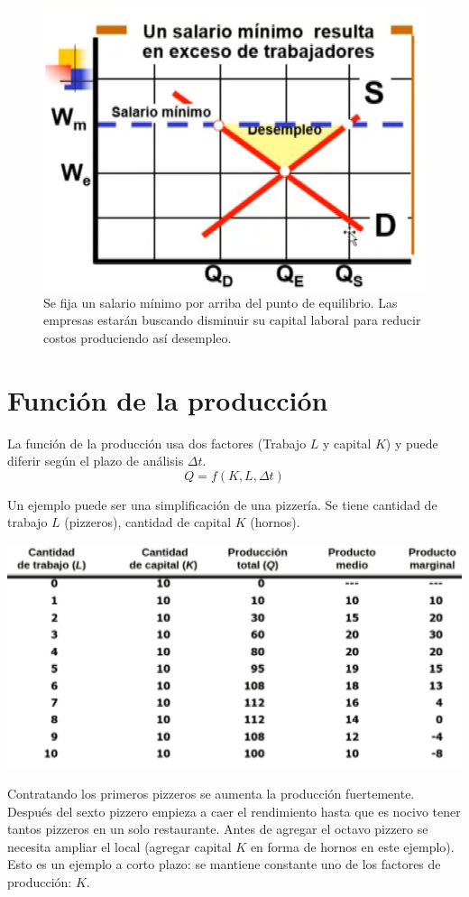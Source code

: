 \documentclass[twocolumn,10pt]{article}
\begin{document}
\begin{figure}[tbh!]
	\centering
	\includegraphics[width=1\linewidth]{fig/escasezProductor}
	\caption{Se fija un salario m\'inimo por arriba del punto de equilibrio. Las empresas estar\'an buscando disminuir su capital laboral para reducir costos produciendo as\'i desempleo.}
	\label{fig:escasezproductor}
\end{figure}



\section{Función de la producción}
La función de la producción usa dos factores (Trabajo $L$ y capital $K$) y puede diferir según el plazo de análisis $\Delta t$.
\[
Q = f(K,L, \Delta t)
\]

Un ejemplo puede ser una simplificaci\'on de una pizzer\'ia. Se tiene cantidad de trabajo $L$ (pizzeros), cantidad de capital $K$ (hornos).

\begin{table}[tbh!]
	\centering
	\includegraphics[width=1\linewidth]{fig/funcionProduccionTabla}
	\caption{Contratando los primeros pizzeros se aumenta la producci\'on fuertemente. Después del sexto pizzero empieza a caer el rendimiento hasta que es nocivo tener tantos pizzeros en un solo restaurante. Antes de agregar el octavo pizzero se necesita ampliar el local (agregar capital $K$ en forma de hornos en este ejemplo). Esto es un ejemplo a corto plazo: se mantiene constante uno de los factores de producci\'on: $K$.}
	\label{fig:funcionproducciontabla}
\end{table}
\end{document}
